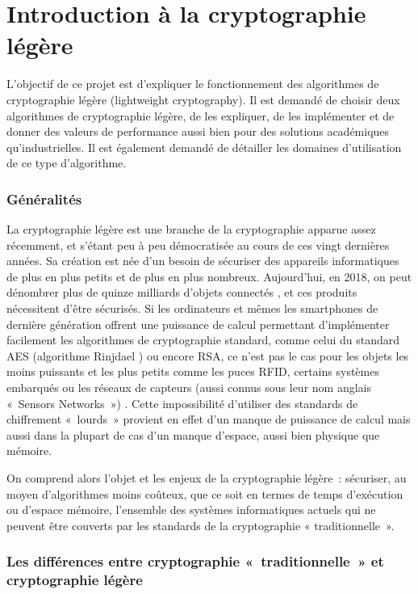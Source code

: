 \newpage
\part{Introduction à la cryptographie légère}

		L'objectif de ce projet est d'expliquer le fonctionnement des algorithmes de cryptographie légère (lightweight cryptography).
	Il est demandé de choisir deux algorithmes de cryptographie légère, de les expliquer,
	de les implémenter et de donner des valeurs de performance aussi bien pour des solutions académiques qu'industrielles.
	Il est également demandé de détailler les domaines d'utilisation de ce type d'algorithme.

	\section{Généralités}

			La cryptographie légère est une branche de la cryptographie apparue assez
		récemment, et s’étant peu à peu démocratisée au cours de ces vingt
		dernières années. Sa création est née d’un besoin de sécuriser des
		appareils informatiques de plus en plus petits et de plus en plus
		nombreux. Aujourd’hui, en 2018, on peut dénombrer  plus de  quinze
		milliards d’objets connectés \cite{renaud_developpement_2017}, et ces
		produits nécessitent d’être sécurisés. Si les ordinateurs et mêmes les
		smartphones de dernière génération offrent une puissance de calcul
		permettant d’implémenter facilement les algorithmes de cryptographie
		standard, comme celui du standard AES (algorithme Rinjdael
		\cite{AES-FIPS}) ou encore RSA, ce n’est pas le cas pour les objets les
		moins puissants et les plus petits comme les puces RFID,
		certains systèmes embarqués ou les réseaux de capteurs (aussi connus sous
		leur nom anglais « Sensors Networks ») \cite{Report_light}. Cette
		impossibilité d’utiliser des standards de chiffrement « lourds » provient
		en effet d’un manque de puissance de calcul mais aussi dans la plupart de
		cas d’un manque d’espace, aussi bien physique que mémoire.

			On comprend alors l’objet et les enjeux de la cryptographie légère :
		sécuriser, au moyen d’algorithmes moins coûteux, que ce soit en termes de
		temps d’exécution ou d’espace mémoire, l’ensemble des systèmes informatiques
		actuels qui ne peuvent être couverts par les standards de la cryptographie «
		traditionnelle ».

	\section{Les différences entre cryptographie « traditionnelle » et cryptographie légère}

